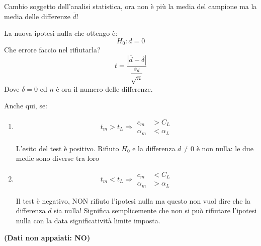 \documentclass[a4paper, 15pt]{article}
\begin{document}
\begin{adjustwidth}{2in}{}
		Cambio soggetto dell'analisi statistica, ora non è più la media del campione ma la media delle differenze $\overline{d}$!
		
		La nuova ipotesi nulla che ottengo è: \[H_0: d = 0\]		
		Che errore faccio nel rifiutarla? 
		\[t = \dfrac{|\overline{d}-\delta|}{\dfrac{s_d}{\sqrt{n}}}\]
		Dove $\delta=0$ ed $n$ è ora il numero delle differenze. 
		
		Anche qui, se:
		\begin{enumerate}
			\item \[t_m>t_L \Rightarrow \begin{aligned}
				c_m&>C_L \\
				\alpha_m&<\alpha_L
			\end{aligned}\]
			
			L'esito del test è positivo. Rifiuto $H_0$ e la differenza $d\ne0$ è non nulla: le due medie sono diverse tra loro 
			
			\item \[t_m<t_L \Rightarrow \begin{aligned}
				c_m&<C_L \\
				\alpha_m&>\alpha_L
			\end{aligned}\]
			
			Il test è negativo, NON rifiuto l'ipotesi nulla ma questo non vuol dire che la differenza $d$ sia nulla! Significa semplicemente che non si può rifiutare l'ipotesi nulla con la data significatività limite imposta. 
		\end{enumerate}
	\textbf{(Dati non appaiati: NO)}	
\end{adjustwidth}
\newpage
\end{document}
